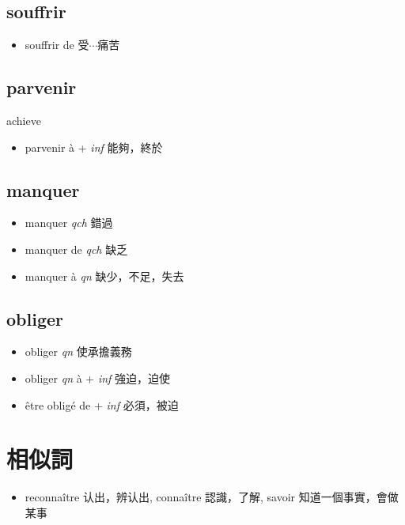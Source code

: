 \documentclass{book}
\begin{document}
        \subsection{souffrir}
            \begin{itemize}
                \item souffrir de 受$\cdots$痛苦
            \end{itemize}

        \subsection{parvenir}
            achieve
            \begin{itemize}
                \item parvenir à + \textit{inf} 能夠，終於
            \end{itemize}

        \subsection{manquer}
            \begin{itemize}
                \item manquer \textit{qch} 錯過
                \item manquer de \textit{qch} 缺乏
                \item manquer à \textit{qn} 缺少，不足，失去
            \end{itemize}

        \subsection{obliger}
            \begin{itemize}
                \item obliger \textit{qn} 使承擔義務
                \item obliger \textit{qn} à + \textit{inf} 強迫，迫使
                \item être obligé de + \textit{inf} 必須，被迫
            \end{itemize}

    \section{相似詞}
        \begin{itemize}
            \item reconnaître 认出，辨认出, connaître 認識，了解, savoir 知道一個事實，會做某事
        \end{itemize}
\end{document}
